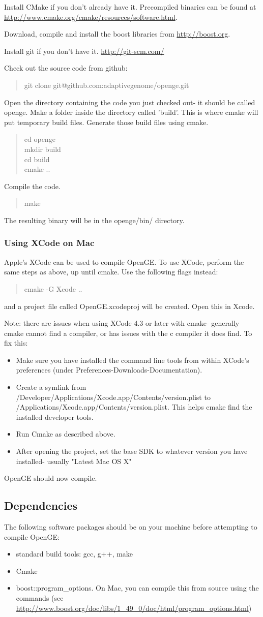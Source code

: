 \documentclass[11pt]{article}
\newcommand {\cmd}[1] {\begin{quote}#1\end{quote}}
\begin{document}
Install CMake if you don't already have it. Precompiled binaries can be found at \url{http://www.cmake.org/cmake/resources/software.html}.

Download, compile and install the boost libraries from \url{http://boost.org}.

Install git if you don't have it. \url{http://git-scm.com/}

Check out the source code from github:
\cmd{git clone git@github.com:adaptivegenome/openge.git}

Open the directory containing the code you just checked out- it should be called openge. Make a folder inside the directory called 'build'. This is where cmake will put temporary build files. Generate those build files using cmake.
\cmd{cd openge\\mkdir build\\cd build\\cmake ..}

Compile the code.
\cmd{make}
The resulting binary will be in the openge/bin/ directory.

\subsubsection{Using XCode on Mac}
Apple's XCode can be used to compile OpenGE. To use XCode, perform the same steps as above, up until cmake. Use the following flags instead:
\cmd{cmake -G Xcode ..}
and a project file called OpenGE.xcodeproj will be created. Open this in Xcode.

Note: there are issues when using XCode 4.3 or later with cmake- generally cmake cannot find a compiler, or has issues with the c compiler it does find. To fix this:
\begin{itemize}
\item Make sure you have installed the command line tools from within XCode's preferences (under Preferences-Downloads-Documentation).
\item Create a symlink from /Developer/Applications/Xcode.app/Contents/version.plist to /Applications/Xcode.app/Contents/version.plist. This helps cmake find the installed developer tools.
\item Run Cmake as described above.
\item After opening the project, set the base SDK to whatever version you have installed- usually "Latest Mac OS X"
\end{itemize}
OpenGE should now compile.

\subsection{Dependencies}
The following software packages should be on your machine before attempting to compile OpenGE:
\begin{itemize}
\item standard build tools: gcc, g++, make
\item Cmake
\item boost::program\_options. On Mac, you can compile this from source using the commands  (see \url{http://www.boost.org/doc/libs/1_49_0/doc/html/program_options.html})
\end{itemize}
\end{document}
